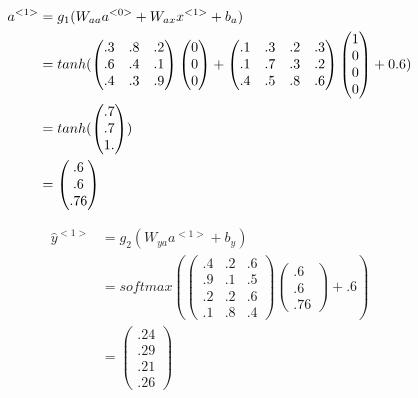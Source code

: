\begin{equation*}
    \begin{split}
    a^{<1>} & = g_{1}(W_{aa}a^{<0>} + W_{ax}x^{<1>} + b_{a}) \\
     & = tanh ( \space
        \begin{pmatrix} .3 & .8 & .2 \\  .6 & .4 & .1 \\ .4 & .3 & .9 \end{pmatrix}
        \begin{pmatrix}0\\0\\0\end{pmatrix} +
        \begin{pmatrix}.1 & .3 & .2 & .3\\ .1 & .7 & .3 & .2\\.4 & .5 & .8 & .6\end{pmatrix}
        \begin{pmatrix} 1 \\ 0 \\ 0 \\ 0 \end{pmatrix}
        + 0.6 \space  )\\
     & = tanh( \begin{pmatrix}  .7 \\ .7 \\ 1. \end{pmatrix} ) \\
     & = \begin{pmatrix} .6 \\ .6 \\ .76 \end{pmatrix}
    \end{split}
\end{equation*}

\begin{equation*}
    \begin{split}
    \widehat{y}^{<1>} & = g_{2}(W_{ya}a^{<1>} + b_{y}) \\
     & = softmax(
     \begin{pmatrix}.4 & .2 & .6\\
                    .9 & .1 & .5\\
                    .2 & .2 & .6\\
                    .1 & .8 & .4  \end{pmatrix}
     \begin{pmatrix} .6 \\ .6 \\ .76 \end{pmatrix}
     + .6 )\\
     & = \begin{pmatrix} .24 \\ .29 \\ .21 \\ .26 \end{pmatrix}
    \end{split}
\end{equation*}

